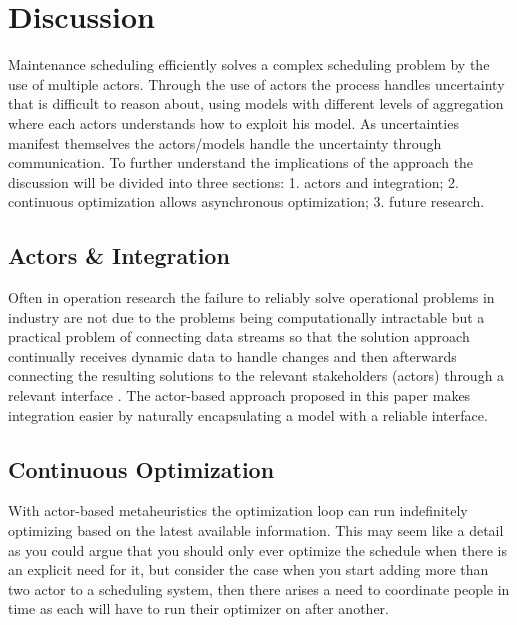 \section{Discussion}
\label{sec:4-discussion}
Maintenance scheduling efficiently solves a complex scheduling problem by
the use of multiple actors. Through the use of actors the  process handles
uncertainty that is difficult to reason about, using models with different
levels of aggregation where each actors understands how to exploit his model.
As uncertainties manifest themselves the actors/models handle the uncertainty
through  communication. To further understand the implications of the approach
the discussion will be divided into three sections: 1. actors and  integration;
2. continuous optimization allows asynchronous optimization; 3. future research.

\subsection{Actors \& Integration}
Often in operation research the failure to reliably solve operational problems in 
industry are not due to the problems being computationally intractable \cite{gendreauHandbookMetaheuristics2019} but a
practical problem of connecting data streams so that the solution approach continually
receives dynamic data to handle changes and then afterwards connecting the resulting solutions
to the relevant stakeholders (actors) through a relevant interface \cite{meignanReviewTaxonomyInteractive2015}.
The actor-based approach  proposed in this paper makes integration easier by
naturally encapsulating a model with a reliable interface. 

\subsection{Continuous Optimization}
With actor-based metaheuristics the optimization loop can run 
indefinitely optimizing based on the latest available information. This may seem like a detail as you could argue that you should only ever optimize the schedule when there is 
an explicit need for it, but consider the case when you start adding more than two actor to a scheduling system, then there arises a need
to coordinate people in time as each will have to run their optimizer on after another.

\begin{figure}[H]
	
\end{figure}

